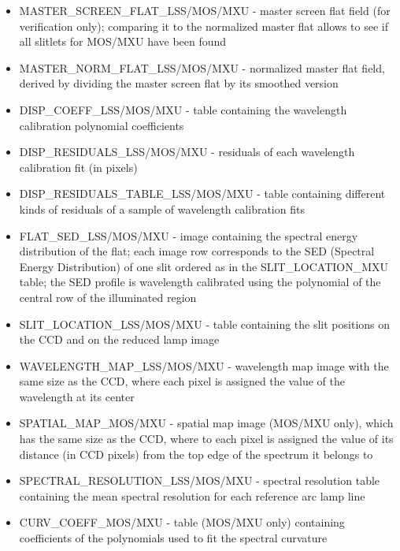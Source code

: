 \begin{itemize}

\item MASTER\_SCREEN\_FLAT\_LSS/MOS/MXU - master screen flat field (for verification only); comparing it to the normalized master flat allows to see if all slitlets for MOS/MXU have been found

\item MASTER\_NORM\_FLAT\_LSS/MOS/MXU - normalized master flat field, derived by dividing the master screen flat by its smoothed version 

\item DISP\_COEFF\_LSS/MOS/MXU - table containing the wavelength calibration polynomial coefficients

\item DISP\_RESIDUALS\_LSS/MOS/MXU - residuals of each wavelength calibration fit (in pixels)

\item DISP\_RESIDUALS\_TABLE\_LSS/MOS/MXU - table containing different kinds of residuals of a sample of wavelength calibration fits

\item FLAT\_SED\_LSS/MOS/MXU - image containing the spectral energy distribution of the flat; each image row corresponds to the SED (Spectral Energy Distribution) of one slit ordered as in the SLIT\_LOCATION\_MXU table; the SED profile is wavelength calibrated using the polynomial of the central row of the illuminated region

\item SLIT\_LOCATION\_LSS/MOS/MXU - table containing the slit positions on the CCD and on the reduced lamp image

\item WAVELENGTH\_MAP\_LSS/MOS/MXU - wavelength map image with the same size as the CCD, where each pixel is assigned the value of the wavelength at its center

\item SPATIAL\_MAP\_MOS/MXU - spatial map image (MOS/MXU only), which has the
same size as the CCD, where to each pixel is assigned the value of its
distance (in CCD pixels) from the top edge of the spectrum it belongs to

\item SPECTRAL\_RESOLUTION\_LSS/MOS/MXU - spectral resolution table containing the mean spectral resolution for each reference arc lamp line

\item CURV\_COEFF\_MOS/MXU - table (MOS/MXU only) containing coefficients of the polynomials used to fit the spectral curvature


\end{itemize}
